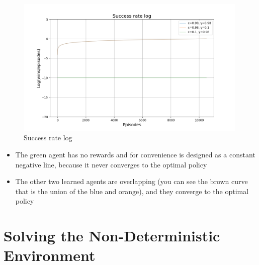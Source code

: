 \begin{figure}[H]
    \centering
    \includegraphics[width=0.99\textwidth]{images/success_rate_log.png}
    \caption{Success rate log}
    \label{fig:success_rate_log}
\end{figure}

\begin{itemize}
    \item The green agent has no rewards and for convenience is designed as a constant negative line, because it never converges to the optimal policy
    \item The other two learned agents are overlapping (you can see the brown curve that is the union of the blue and orange), and they converge to the optimal policy
\end{itemize}
\section{Solving the Non-Deterministic Environment}
